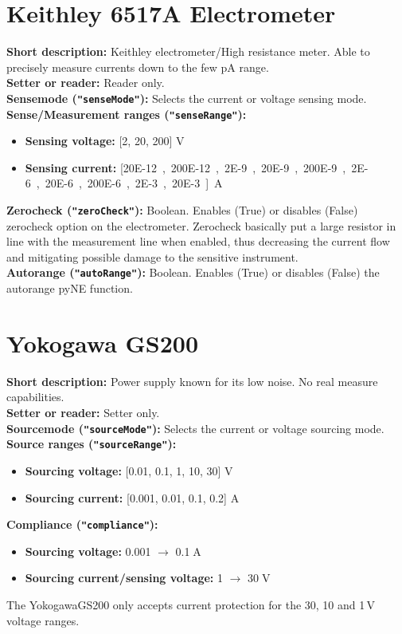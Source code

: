 \section{Keithley 6517A Electrometer }
\textbf{\textsf{Short description}:} Keithley electrometer/High resistance meter. Able to precisely measure currents down to the few pA range. \\
\textbf{\textsf{Setter or reader}:} Reader only.\\
\textbf{\textsf{Sensemode} (\texttt{"senseMode"}):} Selects the current or voltage sensing mode.\\
\textbf{\textsf{Sense/Measurement ranges} (\texttt{"senseRange"}):}
\begin{itemize}[noitemsep]
\item \textbf{\textsf{Sensing voltage:}} [2, 20, 200] V\\
\item \textbf{\textsf{Sensing current:}} [\SI{20E-12}, \SI{200E-12}, \SI{2E-9}, \SI{20E-9}, \SI{200E-9}, \SI{2E-6}, \SI{20E-6}, \SI{200E-6}, \SI{2E-3}, \SI{20E-3}] A
\end{itemize}
\textbf{\textsf{Zerocheck} (\texttt{"zeroCheck"}):} Boolean. Enables (True) or disables (False) zerocheck option on the electrometer. Zerocheck basically put a large resistor in line with the measurement line when enabled, thus decreasing the current flow and mitigating possible damage to the sensitive instrument.\\
\textbf{\textsf{Autorange} (\texttt{"autoRange"}):} Boolean. Enables (True) or disables (False) the autorange pyNE function.\\

\section{Yokogawa GS200}
\textbf{\textsf{Short description}:} Power supply known for its low noise. No real measure capabilities. \\
\textbf{\textsf{Setter or reader}:} Setter only.\\
\textbf{\textsf{Sourcemode} (\texttt{"sourceMode"}):} Selects the current or voltage sourcing mode.\\
\textbf{\textsf{Source ranges} (\texttt{"sourceRange"}):}
\begin{itemize}[noitemsep]
\item \textbf{\textsf{Sourcing voltage:}} [0.01, 0.1, 1, 10, 30] V\\
\item \textbf{\textsf{Sourcing current:}} [0.001, 0.01, 0.1, 0.2] A
\end{itemize}
\textbf{\textsf{Compliance} (\texttt{"compliance"}):}
\begin{itemize}[noitemsep]
\item \textbf{\textsf{Sourcing voltage:}} 0.001 $\rightarrow$ 0.1$\;$A\\
\item \textbf{\textsf{Sourcing current/sensing voltage:}} 1 $\rightarrow$ 30$\;$V
\end{itemize}
The YokogawaGS200 only accepts current protection for the 30, 10 and 1$\,$V voltage ranges.\\
\\

